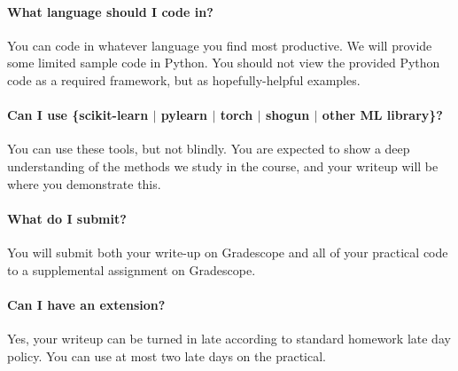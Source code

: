 \documentclass[12pt]{article}
\begin{document}
\paragraph{What language should I code in?}
You can code in whatever language you find most productive.  We will
provide some limited sample code in Python.  You should not view the
provided Python code as a required framework, but as hopefully-helpful
examples.

\paragraph{Can I use \{scikit-learn $|$ pylearn $|$ torch $|$ shogun $|$ other ML library\}?}
You can use these tools, but not blindly.  You are expected to show a
deep understanding of the methods we study in the course, and your
writeup will be where you demonstrate this.

\paragraph{What do I submit?}
You will submit both your write-up on Gradescope and all of your practical code to a supplemental assignment on Gradescope.

\paragraph{Can I have an extension?}
Yes, your writeup can be turned in late according to standard homework late day policy.  You can use at most two late days on the practical.
\end{document}
